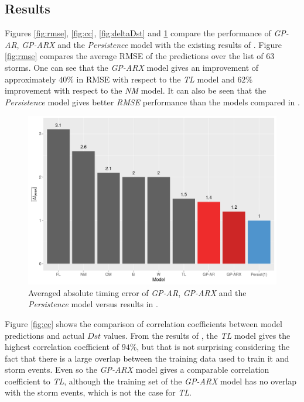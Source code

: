\documentclass[referee,a4paper,12pt,traditabstract]{swsc}
\begin{document}
\begin{linenumbers}
\section{Results} \label{sec:res}

Figures \ref{fig:rmse}, \ref{fig:cc}, \ref{fig:deltaDst} and \ref{fig:timingErr} compare the performance of \emph{GP-AR}, \emph{GP-ARX} and the \emph{Persistence} model with the existing results of \citet{Ji2012}. Figure \ref{fig:rmse} compares the average RMSE of the predictions over the list of 63 storms. One can see that the \emph{GP-ARX} model gives an improvement of approximately $40\%$ in RMSE with respect to the \emph{TL} model and $62\%$ improvement with respect to the \emph{NM} model. It can also be seen that the \emph{Persistence} model gives better \emph{RMSE} performance than the models compared in \citet{Ji2012}.

\begin{figure}
   \centering
   \includegraphics[width=\textwidth]{Compare_timingerr.png}
      \caption{Averaged absolute timing error of \emph{GP-AR}, \emph{GP-ARX} and the \emph{Persistence} model versus results in \citet{Ji2012}.}
         \label{fig:timingErr}
   \end{figure}

Figure \ref{fig:cc} shows the comparison of correlation coefficients between model predictions and actual $Dst$ values. From the results of \citet{Ji2012}, the \emph{TL} model gives the highest correlation coefficient of $94\%$, but that is not surprising considering the fact that there is a large overlap between the training data used to train it and storm events. Even so the \emph{GP-ARX} model gives a comparable correlation coefficient to \emph{TL}, although the training set of the \emph{GP-ARX} model has no overlap with the storm events, which is not the case for \emph{TL}.


\end{linenumbers}
\end{document}

